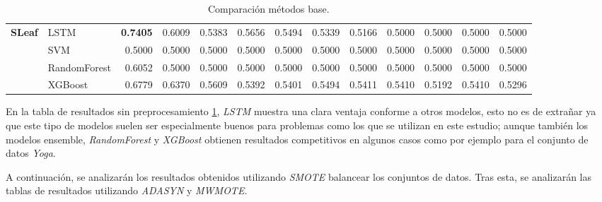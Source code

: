 \begin{table}[h]
\begin{adjustbox}{max width=15cm}
\begin{tabular}{|c|l|r|r|r|r|r|r|r|r|r|r|r|}
	\hline
	\textbf{SLeaf} & LSTM &  \textbf{0.7405} &  0.6009 &  0.5383 &  0.5656 &  0.5494 &  0.5339 &  0.5166 &  0.5000 &  0.5000 &  0.5000 &  0.5000 \\
	& SVM &  0.5000 &  0.5000 &  0.5000 &  0.5000 &  0.5000 &  0.5000 &  0.5000 &  0.5000 &  0.5000 &  0.5000 &  0.5000 \\
	& RandomForest &  0.6052 &  0.5000 &  0.5000 &  0.5000 &  0.5000 &  0.5000 &  0.5000 &  0.5000 &  0.5000 &  0.5000 &  0.5000 \\
	& XGBoost &  0.6779 &  0.6370 &  0.5609 &  0.5392 &  0.5401 &  0.5494 &  0.5411 &  0.5410 &  0.5192 &  0.5410 &  0.5296 \\
	\hline
\end{tabular}
\end{adjustbox}
\caption{Comparación métodos base.}
\label{tab:all_comp_base}
\end{table}
\verticalspace

En la tabla de resultados sin preprocesamiento \ref{tab:all_comp_base}, \textit{LSTM} muestra una clara ventaja conforme a otros modelos, esto no es de extrañar ya que este tipo de modelos suelen ser especialmente buenos para problemas como los que se utilizan en este estudio; aunque también los modelos ensemble, \textit{RandomForest} y \textit{XGBoost} obtienen resultados competitivos en algunos casos como por ejemplo para el conjunto de datos \textit{Yoga}.\newline

A continuación, se analizarán los resultados obtenidos utilizando \newline \textit{SMOTE} balancear los conjuntos de datos. Tras esta, se analizarán las tablas de resultados utilizando \textit{ADASYN} y \textit{MWMOTE}.

